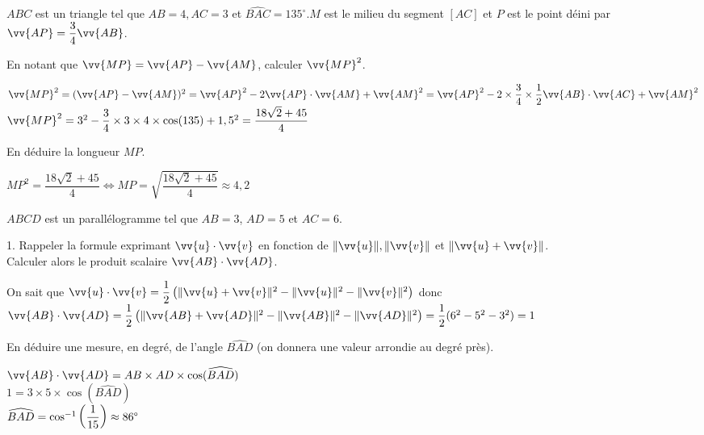 \documentclass[12pt,a4paper]{article}  %
\begin{document}
\exerciceDS{}
$A B C$ est un triangle tel que $A B=4, A C=3$ et $\widehat{B A C}=135^{\circ} . M$ est le milieu du segment $[A C]$ et $P$ est le point déini par $\vv{A P}=\dfrac{3}{4} \vv{A B}$.
\begin{enumMet}
    \item En notant que $\vv{M P}=\vv{A P}-\vv{A M}$, calculer $\vv{M P}^2$.\\
    \begin{corrBox}
        $\vv{M P}^2=(\vv{A P}-\vv{A M})^2=\vv{A P}^2-2\vv{A P}\cdot\vv{A M}+\vv{A M}^2=\vv{A P}^2-2\times \dfrac{3}{4}\times\dfrac{1}{2}\vv{A B}\cdot\vv{A C}+\vv{A M}^2$\\
        $\vv{M P}^2=3^2-\dfrac{3}{4}\times3\times4\times\cos(135)+1,5^2=\dfrac{18\sqrt{2}+45}{4}$
    \end{corrBox}
    \item En déduire la longueur $M P$.\\
    \begin{corrBox}
        $MP^2=\dfrac{18\sqrt{2}+45}{4} \iff MP=\sqrt{\dfrac{18\sqrt{2}+45}{4}}\approx4,2$
    \end{corrBox}
\end{enumMet}

\exerciceDS{}
$A B C D$ est un parallélogramme tel que $A B=3$, $A D=5$ et $A C=6$.
\begin{enumMet}
    \item 1. Rappeler la formule exprimant $\vv{u} \cdot \vv{v}$ en fonction de $\|\vv{u}\|,\|\vv{v}\|$ et $\|\vv{u}+\vv{v}\|$.\\
    Calculer alors le produit scalaire $\vv{A B} \cdot \vv{A D}$.\\
    \begin{corrBox}
        On sait que $\vv{u} \cdot \vv{v}=\dfrac{1}{2}\left(\|\vv{u}+\vv{v}\|^{2}-\|\vv{u}\|^{2}-\|\vv{v}\|^{2}\right)$ donc\\
        $\vv{AB} \cdot \vv{AD}=\dfrac{1}{2}\left(\|\vv{AB}+\vv{AD}\|^{2}-\|\vv{AB}\|^{2}-\|\vv{AD}\|^{2}\right)=\dfrac{1}{2}(6^2-5^2-3^2)=1$
    \end{corrBox}   
    \item En déduire une mesure, en degré, de l'angle $\widehat{B A D}$ (on donnera une valeur arrondie au degré près).\\
    \begin{corrBox}
        $\vv{AB}\cdot\vv{AD}=AB\times AD\times\cos(\widehat{BAD})$\\
        $1=3\times5\times\cos(\widehat{BAD})$\\
        $\widehat{BAD}=\cos^{-1}\left(\dfrac{1}{15}\right)\approx86\degree$
    \end{corrBox}
\end{enumMet}
\end{document}
